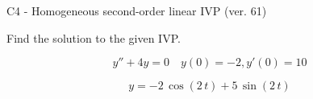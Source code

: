 \begin{exercise}
  \begin{exerciseTitle}C4 - Homogeneous second-order linear IVP (ver. 61)\end{exerciseTitle}
  \begin{exerciseStatement}
    
Find the solution to the given IVP.

    
\[y''+4y = 0 \hspace{1em} y(0) = -2 , y'(0) = 10\]

  \end{exerciseStatement}
  \begin{exerciseAnswer}
    
\[y= -2 \, \cos\left(2 \, t\right) + 5 \, \sin\left(2 \, t\right)\]

  \end{exerciseAnswer}
\end{exercise}